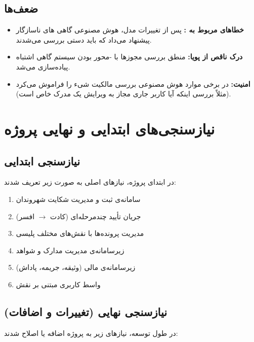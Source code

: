 \documentclass[12pt]{article} %
\theoremstyle{definition}
\begin{document}
\subsection{ضعف‌ها}

\begin{itemize}[rightmargin=1cm]
  \item \textbf{خطاهای مربوط به :}
    پس از تغییرات مدل، هوش مصنوعی گاهی های ناسازگار پیشنهاد می‌داد که باید دستی بررسی می‌شدند.
  \item \textbf{درک ناقص از  پویا:}
    منطق بررسی مجوزها با -محور بودن سیستم گاهی اشتباه پیاده‌سازی می‌شد.
  \item \textbf{امنیت:}
    در برخی موارد هوش مصنوعی بررسی مالکیت شیء را فراموش می‌کرد (مثلاً بررسی اینکه آیا کاربر جاری مجاز به ویرایش یک مدرک خاص است).
\end{itemize}

\section{نیازسنجی‌های ابتدایی و نهایی پروژه}

\subsection{نیازسنجی ابتدایی}

در ابتدای پروژه، نیازهای اصلی به صورت زیر تعریف شدند:

\begin{enumerate}[rightmargin=1cm]
  \item سامانه‌ی ثبت و مدیریت شکایت شهروندان
  \item جریان تأیید چندمرحله‌ای (کادت $\to$ افسر)
  \item مدیریت پرونده‌ها با نقش‌های مختلف پلیسی
  \item زیرسامانه‌ی مدیریت مدارک و شواهد
  \item زیرسامانه‌ی مالی (وثیقه، جریمه، پاداش)
  \item واسط کاربری مبتنی بر نقش
\end{enumerate}

\subsection{نیازسنجی نهایی (تغییرات و اضافات)}

در طول توسعه، نیازهای زیر به پروژه اضافه یا اصلاح شدند:
\end{document}

